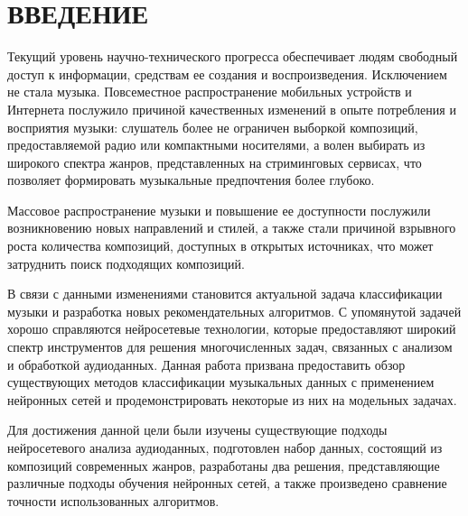 \chapter*{\large ВВЕДЕНИЕ}  
Текущий уровень научно-технического прогресса обеспечивает 
людям свободный
доступ к информации, средствам ее создания и воспроизведения. Исключением не
стала музыка. Повсеместное распространение мобильных устройств и 
Интернета послужило причиной качественных изменений в опыте потребления и
восприятия музыки: слушатель более не ограничен выборкой композиций, предоставляемой
радио или компактными носителями, а волен выбирать из широкого спектра жанров,
представленных на стриминговых сервисах, что позволяет формировать музыкальные
предпочтения более глубоко.

Массовое распространение музыки и повышение ее доступности послужили возникновению 
новых направлений и стилей, а также стали причиной взрывного роста количества композиций, 
доступных в открытых источниках, что может затруднить поиск подходящих композиций.

В связи с данными изменениями становится актуальной задача
классификации музыки и разработка новых рекомендательных
алгоритмов. С упомянутой задачей хорошо справляются нейросетевые
технологии, которые предоставляют широкий спектр инструментов
для решения многочисленных задач, связанных с анализом и обработкой
аудиоданных. Данная работа призвана предоставить обзор
существующих методов классификации музыкальных данных с применением
нейронных сетей и продемонстрировать некоторые из них на
модельных задачах.

Для достижения данной цели были изучены существующие подходы нейросетевого анализа аудиоданных, подготовлен набор данных, состоящий из композиций современных жанров, разработаны два решения, представляющие
различные подходы обучения нейронных сетей, а также произведено сравнение точности использованных алгоритмов.


